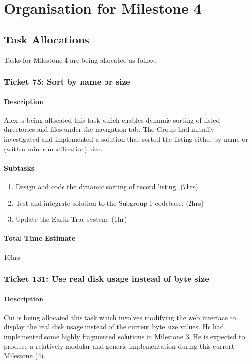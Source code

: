 \documentclass[10pt,a4,oneside]{article}
\begin{document}
\newpage

\section{Organisation for Milestone 4}
 
\label{sec:g1org}

\subsection{Task Allocations}

Tasks for Milestone 4 are being allocated as follow:

\subsubsection{Ticket 75: Sort by name or size}

\paragraph{Description}
Alex is being allocated this task which enables dynamic sorting of 
listed directories and files under the navigation tab. The Group had initially investigated
and implemented a solution that sorted the listing either by name or (with a minor
modification) size.

\paragraph{Subtasks}
\noindent
\begin{enumerate}
\item Design and code the dynamic sorting of record listing. (7hrs)
\item Test and integrate solution to the Subgroup 1 codebase. (2hrs)
\item Update the Earth Trac system. (1hr)
\end{enumerate}

\paragraph{Total Time Estimate} 10hrs

\subsubsection{Ticket 131: Use real disk usage instead of byte size}

\paragraph{Description}
Cui is being allocated this task which involves modifying the web interface 
to display the real disk usage instead of the current byte size values. He
had implemented some highly fragmented solutions in Milestone 3. He is 
expected to produce a relatively modular and generic implementation during
this current Milestone (4).
\end{document}
